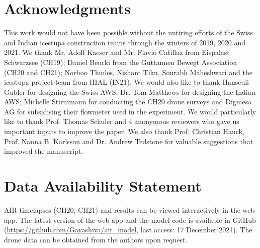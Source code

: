 \documentclass[utf8]{frontiersSCNS}
\begin{document}
\section*{Acknowledgments} This work would not have been possible without the untiring efforts of the Swiss and
Indian icestupa construction teams through the winters of 2019, 2020 and 2021. We thank Mr. Adolf Kaeser and Mr.
Flavio Catillaz from Eispalast Schwarzsee (CH19); Daniel Beurki from the Guttannen Bewegt Association (CH20 and
CH21); Norboo Thinles, Nishant Tiku, Sourabh Maheshwari and the icestupa project team from HIAL (IN21).  We
would also like to thank Hanseuli Gubler for designing the Swiss AWS; Dr. Tom Matthews for designing the Indian
AWS; Michelle Stirnimann for conducting the CH20 drone surveys and Digmesa AG for subsidising their flowmeter
used in the experiment.  We would particularly like to thank Prof. Thomas Schuler and 4 anonymous reviewers who
gave us important inputs to improve the paper. We also thank Prof. Christian Hauck, Prof. Nanna B. Karlsson and
Dr. Andrew Tedstone for valuable suggestions that improved the manuscript.

\section*{Data Availability Statement} AIR timelapses (CH20, CH21) and results can be viewed interactively in
the web app.  The latest version of the web app and the model code  is available in GitHub
(\url{https://github.com/Gayashiva/air_model}, last access: 17 December 2021). The drone data can be obtained from
the authors upon request.

 
\end{document}
